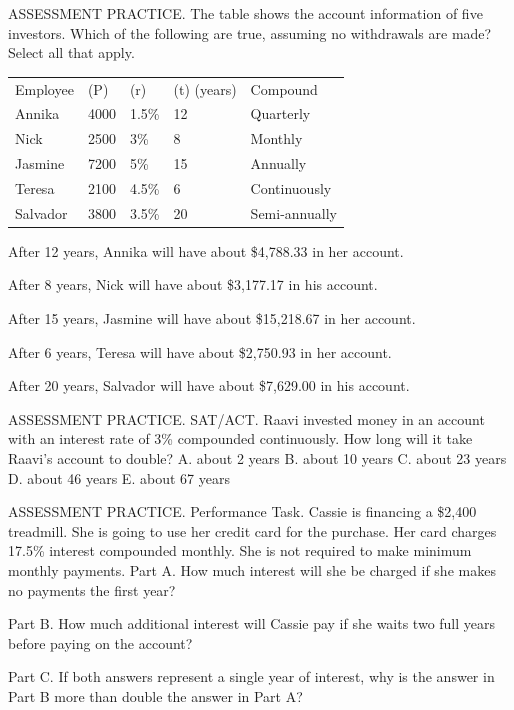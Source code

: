 \documentclass{article}
\newenvironment{practice}[2]{}{}        %
\newcommand{\answer}[1]{}               %
\newcommand{\te}[1]{}                   %
\begin{document}
\begin{practice}{31}{2}
ASSESSMENT PRACTICE. The table shows the account information of five investors. Which of the following are true, assuming no withdrawals are made? Select all that apply.
\begin{tabular}{lllll}
Employee & (P) & (r) & (t) (years) & Compound \\
Annika & 4000 & 1.5\% & 12 & Quarterly \\
Nick & 2500 & 3\% & 8 & Monthly \\
Jasmine & 7200 & 5\% & 15 & Annually \\
Teresa & 2100 & 4.5\% & 6 & Continuously \\
Salvador & 3800 & 3.5\% & 20 & Semi-annually \\
\end{tabular}
\item After 12 years, Annika will have about \$4,788.33 in her account.
\item After 8 years, Nick will have about \$3,177.17 in his account.
\item After 15 years, Jasmine will have about \$15,218.67 in her account.
\item After 6 years, Teresa will have about \$2,750.93 in her account.
\item After 20 years, Salvador will have about \$7,629.00 in his account.
\answer{Second and fourth statements: Nick and Teresa.}
\te{Printed choices are unlettered checkboxes; second and fourth are filled magenta.}
\end{practice}
\begin{practice}{32}{2}
ASSESSMENT PRACTICE. SAT/ACT. Raavi invested money in an account with an interest rate of 3\% compounded continuously. How long will it take Raavi's account to double?
A. about 2 years
B. about 10 years
C. about 23 years
D. about 46 years
E. about 67 years
\answer{C}
\end{practice}
\begin{practice}{33}{3}
ASSESSMENT PRACTICE. Performance Task. Cassie is financing a \$2,400 treadmill. She is going to use her credit card for the purchase. Her card charges 17.5\% interest compounded monthly. She is not required to make minimum monthly payments.
Part A. How much interest will she be charged if she makes no payments the first year?
\answer{Part A. \$455.38}
Part B. How much additional interest will Cassie pay if she waits two full years before paying on the account?
\answer{Part B. \$541.78}
Part C. If both answers represent a single year of interest, why is the answer in Part B more than double the answer in Part A?
\answer{Part C. Each month of the second year, she continues to pay interest on more interest.}
\te{Printed Part C says ``more than double''; likely ``more than,'' since \$541.78 is less than twice \$455.38.}
\end{practice}
\end{document}
